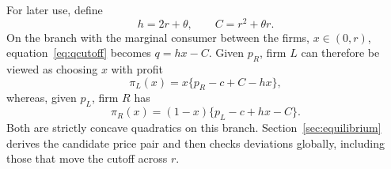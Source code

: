 For later use, define
\begin{equation}
h=2r+\theta,
\qquad
C=r^2+\theta r.
\label{eq:hC}
\end{equation}
On the branch with the marginal consumer between the firms, $x\in(0,r)$, equation~\eqref{eq:qcutoff} becomes $q=hx-C$. Given $p_R$, firm $L$ can therefore be viewed as choosing $x$ with profit
\begin{equation}
\pi_L(x)=x\{p_R-c+C-hx\},
\label{eq:profitLmid}
\end{equation}
whereas, given $p_L$, firm $R$ has
\begin{equation}
\pi_R(x)=(1-x)\{p_L-c+hx-C\}.
\label{eq:profitRmid}
\end{equation}
Both are strictly concave quadratics on this branch. Section~\ref{sec:equilibrium} derives the candidate price pair and then checks deviations globally, including those that move the cutoff across $r$.